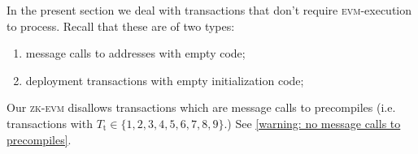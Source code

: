 In the present section we deal with transactions that don't require \textsc{evm}-execution to process. Recall that these are of two types:
\begin{enumerate}
	\item message calls to addresses with empty code;
	\item deployment transactions with empty initialization code;
\end{enumerate}
\saNote{}
Our \textsc{zk-evm} disallows transactions which are message calls to precompiles
(i.e. transactions with $T_\text{t} \in \{1, 2, 3, 4, 5, 6, 7, 8, 9\}$.)
See \ref{warning: no message calls to precompiles}.
